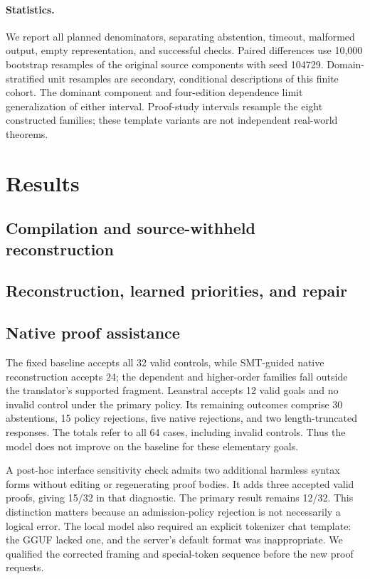 \documentclass{article}
\begin{document}
\paragraph{Statistics.}
We report all planned denominators, separating abstention, timeout, malformed output, empty representation, and successful checks. Paired differences use 10,000 bootstrap resamples of the original source components with seed 104729. Domain-stratified unit resamples are secondary, conditional descriptions of this finite cohort. The dominant component and four-edition dependence limit generalization of either interval. Proof-study intervals resample the eight constructed families; these template variants are not independent real-world theorems.

\section{Results}
\subsection{Compilation and source-withheld reconstruction}



\subsection{Reconstruction, learned priorities, and repair}



\subsection{Native proof assistance}

The fixed baseline accepts all 32 valid controls, while SMT-guided native reconstruction accepts 24; the dependent and higher-order families fall outside the translator's supported fragment. Leanstral accepts 12 valid goals and no invalid control under the primary policy. Its remaining outcomes comprise 30 abstentions, 15 policy rejections, five native rejections, and two length-truncated responses. The totals refer to all 64 cases, including invalid controls. Thus the model does not improve on the baseline for these elementary goals.

A post-hoc interface sensitivity check admits two additional harmless syntax forms without editing or regenerating proof bodies. It adds three accepted valid proofs, giving 15/32 in that diagnostic. The primary result remains 12/32. This distinction matters because an admission-policy rejection is not necessarily a logical error. The local model also required an explicit tokenizer chat template: the GGUF lacked one, and the server's default format was inappropriate. We qualified the corrected framing and special-token sequence before the new proof requests.
\end{document}
